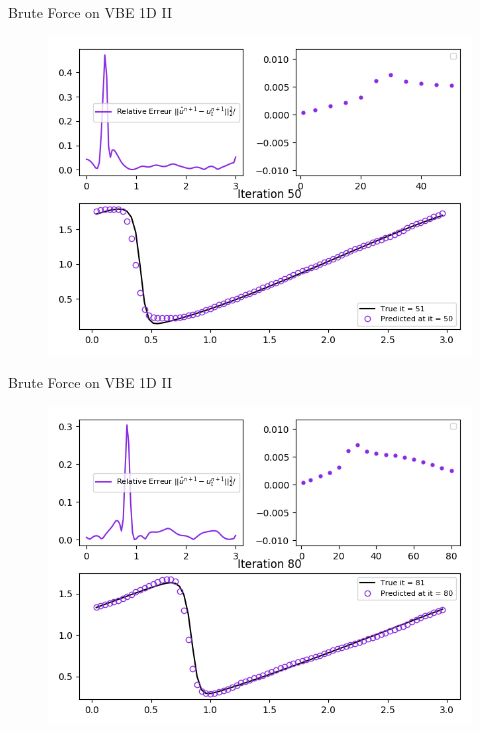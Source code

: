 \documentclass[10pt,
			   xcolor=svgnames,
			   hyperref={linkcolor=red, citecolor = DarkGreen, colorlinks=true, urlcolor=Navy}]{beamer}
\begin{document}
\begin{frame}{Brute Force on VBE 1D II}
	\begin{figure}[H]
	\centering
	\includegraphics[scale=0.5]{Pres_50th_Iteration_2.png}
	\end{figure} 
\end{frame}

\begin{frame}{Brute Force on VBE 1D II}
	\begin{figure}[H]
	\centering
	\includegraphics[scale=0.5]{Pres_Last_Iteration_2.png}
	\end{figure} 
\end{frame}
\end{document}

